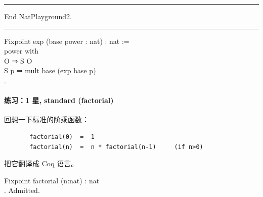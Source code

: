 \documentclass[utf8]{ctexart}
\let\oldparagraph\paragraph
\renewcommand{\paragraph}[1]{\oldparagraph{#1}\mbox{}}
\begin{document}
\begin{center}\rule{0.5\linewidth}{\linethickness}\end{center}

{End} {NatPlayground2}.\\

\begin{center}\rule{0.5\linewidth}{\linethickness}\end{center}

{Fixpoint} {exp} ({base} {power} : {nat}) : {nat} :=\\
\hspace*{0.333em}\hspace*{0.333em}{match} {power} {with}\\
\hspace*{0.333em}\hspace*{0.333em}\hspace*{0.333em}\hspace*{0.333em}\textbar{}
{O} ⇒ {S} {O}\\
\hspace*{0.333em}\hspace*{0.333em}\hspace*{0.333em}\hspace*{0.333em}\textbar{}
{S} {p} ⇒ {mult} {base} ({exp} {base} {p})\\
\hspace*{0.333em}\hspace*{0.333em}{end}.\\

\protect\hypertarget{lab31}{}{}

\hypertarget{ux7ec3ux4e601-ux661f-standard-factorial}{%
\paragraph{练习：1 星, standard
(factorial)}\label{ux7ec3ux4e601-ux661f-standard-factorial}}

回想一下标准的阶乘函数：

\begin{verbatim}
       factorial(0)  =  1
       factorial(n)  =  n * factorial(n-1)     (if n>0)
\end{verbatim}

把它翻译成 Coq 语言。

{Fixpoint} {factorial} ({n}:{nat}) : {nat}\\
\hspace*{0.333em}\hspace*{0.333em}{(*~将本行替换成~":=~\_你的\_定义\_~."~*)}.
{Admitted}.\\
\end{document}
